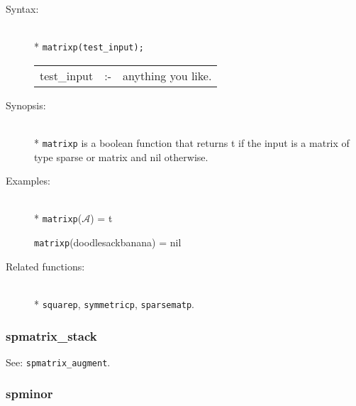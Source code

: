 \begin{description}
\item[Syntax:]\mbox{}\\*
\texttt{matrixp(test\_input);}\\[2mm]
\begin{tabular}{l l l}
test\_input &:-& anything you like.
\end{tabular}

\item[Synopsis:]\mbox{}\\*
\texttt{matrixp} is a boolean function that returns t if 
                the input is a matrix of type sparse or matrix and nil otherwise.

\item[Examples:]\mbox{}\\*
\texttt{matrixp}($\mathcal{A}$) = t 

\texttt{matrixp}(doodlesackbanana) = nil

\item[Related functions:]\mbox{}\\*
\texttt{squarep}, \texttt{symmetricp}, \texttt{sparsematp}.
\end{description}

\subsubsection{spmatrix\_stack}
\label{sparse:spmatrix_stack}
See: \texttt{spmatrix\_augment}.


\subsubsection{spminor}
\label{sparse:spminor}

